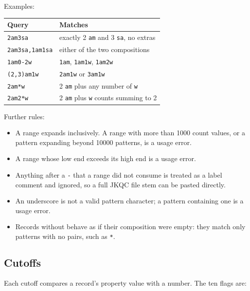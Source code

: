 Examples:

\begin{center}
\begin{tabular}{@{}ll@{}}
\toprule
\textbf{Query} & \textbf{Matches} \\
\midrule
\texttt{2am3sa} & exactly 2 \texttt{am} and 3 \texttt{sa}, no extras \\
\texttt{2am3sa,1am1sa} & either of the two compositions \\
\texttt{1am0-2w} & \texttt{1am}, \texttt{1am1w}, \texttt{1am2w} \\
\texttt{(2,3)am1w} & \texttt{2am1w} or \texttt{3am1w} \\
\texttt{2am*w} & 2 \texttt{am} plus any number of \texttt{w} \\
\texttt{2am2*w} & 2 \texttt{am} plus \texttt{w} counts summing to 2 \\
\bottomrule
\end{tabular}
\end{center}

Further rules:

\begin{itemize}
  \item A range expands inclusively. A range with more than 1000 count values,
        or a pattern expanding beyond 10000 patterns, is a usage error.
  \item A range whose low end exceeds its high end is a usage error.
  \item Anything after a \texttt{-} that a range did not consume is treated
        as a label comment and ignored, so a full JKQC file stem can be
        pasted directly.
  \item An underscore is not a valid pattern character; a pattern containing
        one is a usage error.
  \item Records without  behave as if their composition were
        empty: they match only patterns with no pairs, such as \texttt{*}.
\end{itemize}

\subsection{Cutoffs}\label{sec:cutoffs}

Each cutoff compares a record's property value with a number. The ten flags
are:

